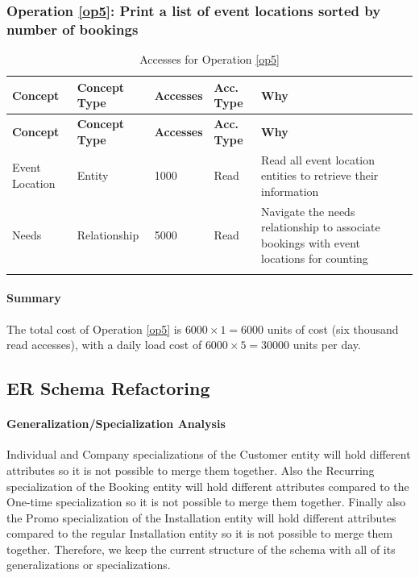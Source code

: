 \subsubsection{Operation \ref{op5}: Print a list of event locations sorted by number of bookings}

\begin{longtable}[H]{|p{2cm}|p{2cm}|p{2cm}|p{2cm}|p{7cm}|}
    \hline
    \textbf{Concept} & \textbf{Concept Type} & \textbf{Accesses} & \textbf{Acc. Type} & \textbf{Why} \\
    \hline
    \endfirsthead
    \hline
    \textbf{Concept} & \textbf{Concept Type} & \textbf{Accesses} & \textbf{Acc. Type} & \textbf{Why} \\
    \hline
    \endhead
    Event Location & Entity & 1000 & Read & Read all event location entities to retrieve their information \\
    \hline
    Needs & Relationship & 5000 & Read & Navigate the needs relationship to associate bookings with event locations for counting \\
    \hline
    \caption{Accesses for Operation \ref{op5}}
    \label{tab:op5-accesses-logical}
\end{longtable}

\paragraph{Summary}
The total cost of Operation \ref{op5} is $6000 \times 1 = 6000$ units of cost (six thousand read accesses), with a daily load cost of $6000 \times 5 = 30000$ units per day.

\subsection{ER Schema Refactoring}

\paragraph{Generalization/Specialization Analysis}

Individual and Company specializations of the Customer entity will hold different attributes so it is not possible to merge them together. Also the Recurring specialization of the Booking entity will hold different attributes compared to the One-time specialization so it is not possible to merge them together. Finally also the Promo specialization of the Installation entity will hold different attributes compared to the regular Installation entity so it is not possible to merge them together. Therefore, we keep the current structure of the schema with all of its generalizations or specializations.

